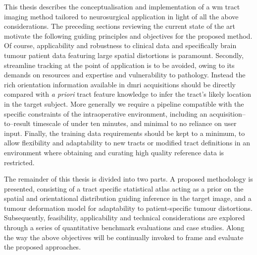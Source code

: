 This thesis describes the conceptualisation and implementation of a \gls{wm} tract imaging method tailored to neurosurgical application in light of all the above considerations.
The preceding sections reviewing the current state of the art motivate the following guiding principles and objectives for the proposed method.
Of course, applicability and robustness to clinical data and specifically brain tumour patient data featuring large spatial distortions is paramount.
Secondly, streamline tracking at the point of application is to be avoided, owing to its demands on resources and expertise and vulnerability to pathology.
Instead the rich orientation information available in \gls{dmri} acquisitions should be directly compared with \textit{a priori} tract feature knowledge to infer the tract's likely location in the target subject. 
More generally we require a pipeline compatible with the specific constraints of the intraoperative environment, including an acquisition--to--result timescale of under ten minutes, and minimal to no reliance on user input.
Finally, the training data requirements should be kept to a minimum, to allow flexibility and adaptability to new tracts or modified tract definitions in an environment where obtaining and curating high quality reference data is restricted.

The remainder of this thesis is divided into two parts.
A proposed methodology is presented, consisting of a tract specific statistical atlas acting as a prior on the spatial and orientational distribution guiding inference in the target image, and a tumour deformation model for adaptability to patient-specific tumour distortions.
Subsequently, feasibility, applicability and technical considerations are explored through a series of quantitative benchmark evaluations and case studies.
Along the way the above objectives will be continually invoked to frame and evaluate the proposed approaches.

